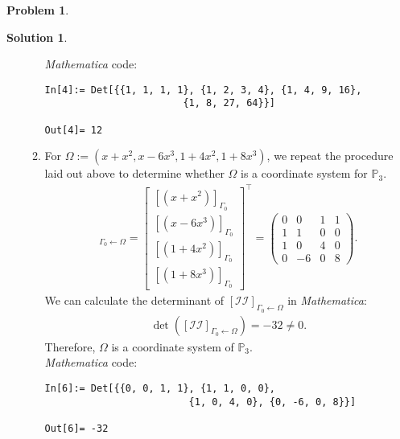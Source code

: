 \documentclass{article}
\theoremstyle{definition}
\newtheorem*{prob*}{Problem}
\newtheorem*{sln*}{Solution}
\begin{document}
\begin{prob*}
\begin{sln*}
\begin{enumerate}
\begin{enumerate}
				\textit{Mathematica} code:
		\begin{lstlisting}
In[4]:= Det[{{1, 1, 1, 1}, {1, 2, 3, 4}, {1, 4, 9, 16}, 
						{1, 8, 27, 64}}]
				
Out[4]= 12
		\end{lstlisting}
		
		
		
		
		
		
				\item For $\Omega := (x+x^2,x-6x^3,1+4x^2,1+8x^3)$, we repeat the procedure laid out above to determine whether $\Omega$ is a coordinate system for $\mathbb{P}_3$. 
				\begin{align*}
				[\mathcal{II}]_{\Gamma_0\leftarrow\Omega}
				= \begin{bmatrix}
				[(x+x^2)]_{\Gamma_0} \\ [(x-6x^3)]_{\Gamma_0} \\ [(1+4x^2)]_{\Gamma_0} \\ [(1+8x^3)]_{\Gamma_0}
				\end{bmatrix}^\top
				= \begin{pmatrix}
				0&0&1&1\\
				1&1&0&0\\
				1&0&4&0\\
				0&-6&0&8
				\end{pmatrix}. 
				\end{align*} 
				We can calculate the determinant of $[\mathcal{II}]_{\Gamma_0\leftarrow\Omega}$ in \textit{Mathematica}:
				\begin{align*}
				\det\left( [\mathcal{II}]_{\Gamma_0\leftarrow\Omega}  \right) = -32 \neq 0.
				\end{align*}
				Therefore, $\Omega$ is a coordinate system of $\mathbb{P}_3$.\\
				
				\textit{Mathematica} code:
				\begin{lstlisting}
In[6]:= Det[{{0, 0, 1, 1}, {1, 1, 0, 0},
						 {1, 0, 4, 0}, {0, -6, 0, 8}}]
				
Out[6]= -32
				\end{lstlisting}
				
			\end{enumerate}
		
		
		

\end{enumerate}
\end{sln*}
\end{prob*}
\end{document}
